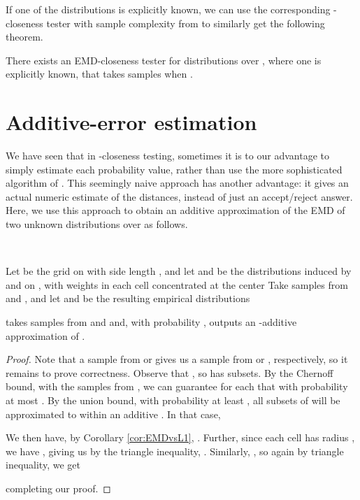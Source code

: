 \documentclass[11pt]{article}
\begin{document}
If one of the distributions is explicitly known, we can use the corresponding -closeness
tester with sample complexity  from \cite{L1indep} to
similarly get the following theorem.

\begin{theorem}
	There exists an EMD-closeness tester for distributions over ,
	where one is explicitly known, that takes  samples
	when .
\end{theorem}

\section{Additive-error estimation}

We have seen that in -closeness testing, sometimes it is to our advantage to
simply estimate each probability value, rather than use the more sophisticated
algorithm of \cite{L1tester}. This seemingly naive approach has another advantage:
it gives an actual numeric estimate of the distances, instead of just an
accept/reject answer. Here, we use this approach to obtain an additive approximation
of the EMD of two unknown distributions over  as follows.

\\
\begin{algorithm}[H]
	Let  be the grid on  with side length ,
		and let  and  be the distributions induced by  and  on , with
		weights in each cell concentrated at the center\;
	Take  samples from  and , and let 
		and  be the resulting empirical distributions\;
	\Return{}
\end{algorithm}

\begin{theorem}
	 takes  samples from  and
	 and, with probability , outputs an -additive approximation of .
\end{theorem}

\begin{proof}
Note that a sample from  or  gives us a sample from  or , respectively, so it remains to prove correctness.
Observe that , so  has  subsets. By the Chernoff bound, with the  samples from , we can guarantee for each  that
 with probability at most . By the union bound, with probability at least , all subsets of  will be approximated to within an additive . In that case,


We then have, by Corollary \ref{cor:EMDvsL1},
. Further, since each cell has radius ,
we have , giving us by the triangle inequality, .
Similarly, , so again by triangle inequality, we get

completing our proof.
\end{proof}
\end{document}

